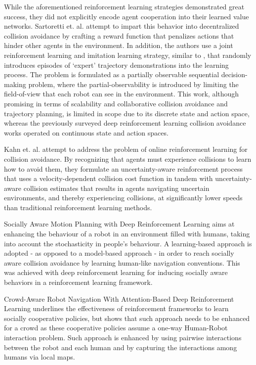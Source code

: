 \documentclass[conference]{IEEEtran}
\begin{document}
While the aforementioned reinforcement learning strategies demonstrated great success, they did not explicitly encode agent cooperation into their learned value networks. Sartoretti et. al. \cite{sartoretti2019} attempt to impart this behavior into decentralized collision avoidance by crafting a reward function that penalizes actions that hinder other agents in the environment. In addition, the authors use a joint reinforcement learning and imitation learning strategy, similar to \cite{chen2017cadrl}, that randomly introduces episodes of ‘expert’ trajectory demonstrations into the learning process. The problem is formulated as a partially observable sequential decision-making problem, where the partial-observability is introduced by limiting the field-of-view that each robot can see in the environment. This work, although promising in terms of scalability and collaborative collision avoidance and trajectory planning, is limited in scope due to its discrete state and action space, whereas the previously surveyed deep reinforcement learning collision avoidance works operated on continuous state and action spaces.

Kahn et. al. \cite{kahn2017} attempt to address the problem of online reinforcement learning for collision avoidance. By recognizing that agents must experience collisions to learn how to avoid them, they formulate an uncertainty-aware reinforcement process that uses a velocity-dependent collision cost function in tandem with uncertainty-aware collision estimates that results in agents navigating uncertain environments, and thereby experiencing collisions, at significantly lower speeds than traditional reinforcement learning methods.

Socially Aware Motion Planning with Deep Reinforcement Learning \cite{SocialCA} aims at enhancing the behaviour of a robot in an environment filled with humans, taking into account the stochasticity in people's behaviour. A learning-based approach is adopted - as opposed to a model-based approach - in order to reach socially aware collision avoidance by learning human-like navigation conventions. This was achieved with deep reinforcement learning for inducing socially aware behaviors in a reinforcement learning framework.

Crowd-Aware Robot Navigation With Attention-Based Deep Reinforcement Learning \cite{Crowd} underlines the effectiveness of reinforcement frameworks\cite{SocialCA} to learn socially cooperative policies, but shows that such approach needs to be enhanced for a crowd as these cooperative policies assume a one-way Human-Robot interaction problem. Such approach is enhanced by using pairwise interactions between the robot and each human and by capturing the interactions among humans via local maps. 
\end{document}
